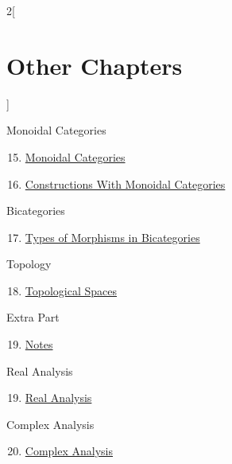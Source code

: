 \begin{multicols}{2}[\section{Other Chapters}]
\begin{enumerate}
\end{enumerate}
Monoidal Categories
\begin{enumerate}
\setcounter{enumi}{14}
\item \hyperref[monoidal-categories:section-phantom]{Monoidal Categories}
\item \hyperref[constructions-with-monoidal-categories:section-phantom]{Constructions With Monoidal Categories}
\end{enumerate}
Bicategories
\begin{enumerate}
\setcounter{enumi}{16}
\item \hyperref[types-of-morphisms-in-bicategories:section-phantom]{Types of Morphisms in Bicategories}
\end{enumerate}
Topology
\begin{enumerate}
\setcounter{enumi}{17}
\item \hyperref[topological-spaces:section-phantom]{Topological Spaces}
\end{enumerate}
Extra Part
\begin{enumerate}
\setcounter{enumi}{18}
\item \hyperref[notes:section-phantom]{Notes}
\end{enumerate}
Real Analysis
\begin{enumerate}
\setcounter{enumi}{18}
\item \hyperref[real-analysis:section-phantom]{Real Analysis}
\end{enumerate}
Complex Analysis
\begin{enumerate}
\setcounter{enumi}{19}
\item \hyperref[complex-analysis:section-phantom]{Complex Analysis}
\end{enumerate}
\end{multicols}
